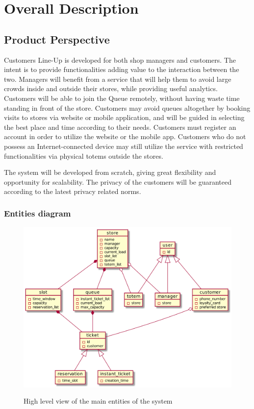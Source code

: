 
\section{Overall Description}\label{sec:overall_desc}

\subsection{Product Perspective}

Customers Line-Up is developed for both shop managers and customers.
The intent is to provide functionalities adding value to the interaction between the two.
Managers will benefit from a service that will help them to avoid large crowds inside and outside their stores, while providing useful analytics.
Customers will be able to join the Queue remotely, without having waste time standing in front of the store.
Customers may avoid queues altogether by booking visits to stores via website or mobile application, and will be guided in selecting the best place and time according to their needs.
Customers must register an account in order to utilize the website or the mobile app.
Customers who do not possess an Internet-connected device may still utilize the service with restricted functionalities via physical totems outside the stores.

The system will be developed from scratch, giving great flexibility and opportunity for scalability.
The privacy of the customers will be guaranteed according to the latest privacy related norms.

\subsubsection{Entities diagram}
\begin{figure}[H]
    \centering
    \includegraphics[width=1\textwidth]{uml/high_level_UML.png}
    \label{fig:high_UML}
    \caption{High level view of the main entities of the system}
\end{figure}


